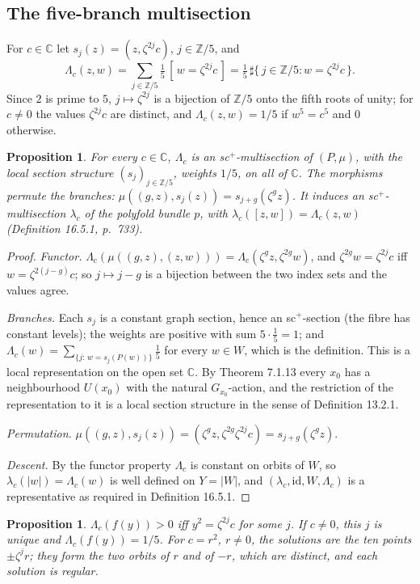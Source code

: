 \documentclass[11pt,a4paper]{article}
\theoremstyle{plain}
\newtheorem{proposition}[theorem]{Proposition}
\theoremstyle{definition}
\theoremstyle{remark}
\newcommand{\C}{\mathbb{C}}
\newcommand{\Z}{\mathbb{Z}}
\newcommand{\ZZ}{\Z/5}
\newcommand{\abs}[1]{\lvert #1\rvert}
\newcommand{\card}{\sharp}
\newcommand{\id}{\mathrm{id}}
\begin{document}
\subsection{The five-branch multisection}

For $c\in\C$ let $s_j(z)=(z,\zeta^{2j}c)$, $j\in\ZZ$, and
\[
  \Lambda_c(z,w)=\sum_{j\in\ZZ}\tfrac15\,[\,w=\zeta^{2j}c\,]
  =\tfrac15\,\card\{\,j\in\ZZ : w=\zeta^{2j}c\,\}.
\]
Since $2$ is prime to $5$, $j\mapsto\zeta^{2j}$ is a bijection of $\ZZ$ onto the fifth roots of unity;
for $c\neq0$ the values $\zeta^{2j}c$ are distinct, and $\Lambda_c(z,w)=1/5$ if $w^5=c^5$ and $0$
otherwise.

\begin{proposition}\label{prop:multisection}
For every $c\in\C$, $\Lambda_c$ is an sc$^+$-multisection of $(P,\mu)$, with the local section structure
$(s_j)_{j\in\ZZ}$, weights $1/5$, on all of $\C$. The morphisms permute the branches:
$\mu((g,z),s_j(z))=s_{j+g}(\zeta^g z)$. It induces an sc$^+$-multisection $\lambda_c$ of the polyfold
bundle $p$, with $\lambda_c([z,w])=\Lambda_c(z,w)$ (Definition 16.5.1, p.~733).
\end{proposition}

\begin{proof}
\emph{Functor.} $\Lambda_c(\mu((g,z),(z,w)))=\Lambda_c(\zeta^g z,\zeta^{2g}w)$, and
$\zeta^{2g}w=\zeta^{2j}c$ iff $w=\zeta^{2(j-g)}c$; so $j\mapsto j-g$ is a bijection between the two
index sets and the values agree.

\emph{Branches.} Each $s_j$ is a constant graph section, hence an sc$^+$-section (the fibre has constant
levels); the weights are positive with sum $5\cdot\frac15=1$; and
$\Lambda_c(w)=\sum_{\{j:\,w=s_j(P(w))\}}\frac15$ for every $w\in W$, which is the definition. This is a
local representation on the open set $\C$. By Theorem 7.1.13 every $x_0$ has a neighbourhood $U(x_0)$
with the natural $G_{x_0}$-action, and the restriction of the representation to it is a local section
structure in the sense of Definition 13.2.1.

\emph{Permutation.} $\mu((g,z),s_j(z))=(\zeta^g z,\zeta^{2g}\zeta^{2j}c)=s_{j+g}(\zeta^g z)$.

\emph{Descent.} By the functor property $\Lambda_c$ is constant on orbits of $W$, so
$\lambda_c(\abs w)=\Lambda_c(w)$ is well defined on $Y=\abs W$, and $(\lambda_c,\id,W,\Lambda_c)$ is a
representative as required in Definition 16.5.1.
\end{proof}

\begin{proposition}\label{prop:solutions}
$\Lambda_c(f(y))>0$ iff $y^2=\zeta^{2j}c$ for some $j$. If $c\neq0$, this $j$ is unique and
$\Lambda_c(f(y))=1/5$. For $c=r^2$, $r\neq0$, the solutions are the ten points $\pm\zeta^jr$; they form the
two orbits of $r$ and of $-r$, which are distinct, and each solution is regular.
\end{proposition}
\end{document}
